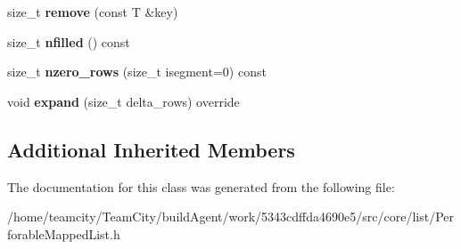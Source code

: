 \begin{DoxyCompactItemize}
\item 
size\+\_\+t {\bfseries remove} (const T \&key)\hypertarget{classPerforableMappedList_a2c172ea8105428b57e61e2f1c4a2d53d}{}\label{classPerforableMappedList_a2c172ea8105428b57e61e2f1c4a2d53d}

\item 
size\+\_\+t {\bfseries nfilled} () const \hypertarget{classPerforableMappedList_a1050b6c3dc74100a9cf473776f8553f8}{}\label{classPerforableMappedList_a1050b6c3dc74100a9cf473776f8553f8}

\item 
size\+\_\+t {\bfseries nzero\+\_\+rows} (size\+\_\+t isegment=0) const \hypertarget{classPerforableMappedList_ac3ca6ee6cdd72ec6cf4ee159b26b00a2}{}\label{classPerforableMappedList_ac3ca6ee6cdd72ec6cf4ee159b26b00a2}

\item 
void {\bfseries expand} (size\+\_\+t delta\+\_\+rows) override\hypertarget{classPerforableMappedList_add2df1139be38db9b8f84658d8049504}{}\label{classPerforableMappedList_add2df1139be38db9b8f84658d8049504}

\end{DoxyCompactItemize}
\subsection*{Additional Inherited Members}


The documentation for this class was generated from the following file\+:\begin{DoxyCompactItemize}
\item 
/home/teamcity/\+Team\+City/build\+Agent/work/5343cdffda4690e5/src/core/list/Perforable\+Mapped\+List.\+h\end{DoxyCompactItemize}
